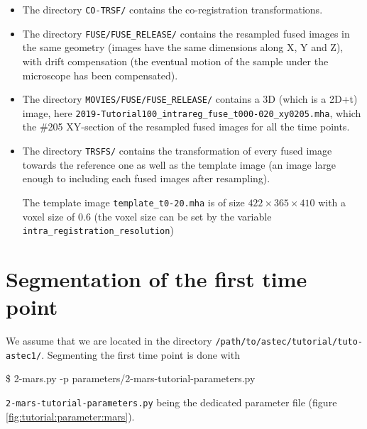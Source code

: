 \mbox{}
\mbox{}

\begin{itemize}
\itemsep -0.5ex
\item The directory \texttt{CO-TRSF/} contains the co-registration
  transformations.
\item The directory \texttt{FUSE/FUSE\_RELEASE/} contains the resampled fused images
  in the same geometry (images have the same dimensions along X, Y and
  Z), with drift compensation (the eventual motion of the sample under the
  microscope has been compensated). 
\item The directory \texttt{MOVIES/FUSE/FUSE\_RELEASE/} contains a 3D (which is a 2D+t)
  image, here
  \texttt{2019-Tutorial100\_intrareg\_fuse\_t000-020\_xy0205.mha}, which
  the \#205 XY-section of the resampled fused images for all the time
  points.
\item The directory \texttt{TRSFS/}  contains the transformation of
  every fused image towards the reference one as well as the template
  image (an image large enough to including each fused images after
  resampling).

  The template image \texttt{template\_t0-20.mha} is of size $422
  \times 365 \times 410$ with a voxel size of 0.6 (the voxel size can
  be set by the variable \texttt{intra\_registration\_resolution})
\end{itemize}





\section{Segmentation of the first time point}


We assume that we are located in the directory
\texttt{/path/to/astec/tutorial/tuto-astec1/}. Segmenting the first
time point is
done with
\begin{code}{0.8}
  \$ 2-mars.py -p parameters/2-mars-tutorial-parameters.py 
\end{code}
\texttt{2-mars-tutorial-parameters.py} being the
dedicated parameter file  (figure \ref{fig:tutorial:parameter:mars}).

